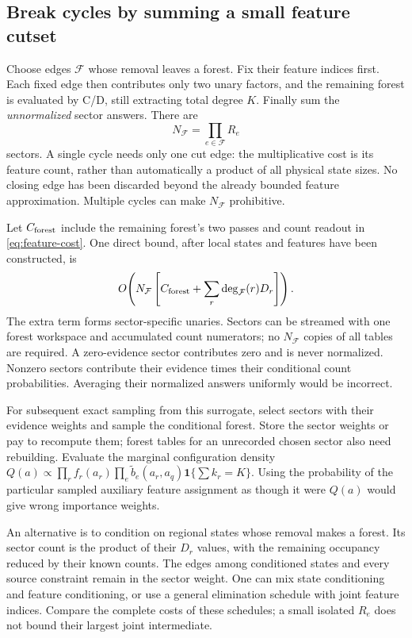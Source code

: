 \documentclass[10pt,a4paper]{article}
\newcommand{\ind}{\mathbf 1}
\begin{document}
\subsection{Break cycles by summing a small feature cutset}
Choose edges $\mathcal F$ whose removal leaves a forest. Fix their feature indices first. Each fixed edge
then contributes only two unary factors, and the remaining forest is evaluated by C/D, still extracting
total degree $K$. Finally sum the \emph{unnormalized} sector answers. There are
\[
 N_{\mathcal F}=\prod_{e\in\mathcal F}R_e
\]
sectors. A single cycle needs only one cut edge: the multiplicative cost is its feature count, rather than
automatically a product of all physical state sizes. No closing edge has been discarded beyond the already
bounded feature approximation. Multiple cycles can make $N_{\mathcal F}$ prohibitive.

Let $C_{\rm forest}$ include the remaining forest's two passes and count readout in
\eqref{eq:feature-cost}. One direct bound, after local states and features have been constructed, is
\begin{equation}
 O\!\left(N_{\mathcal F}
       \left[C_{\rm forest}+\sum_r\deg_{\mathcal F}(r)D_r\right]\right).
 \label{eq:cycle-cost}
\end{equation}
The extra term forms sector-specific unaries. Sectors can be streamed with one forest workspace and
accumulated count numerators; no $N_{\mathcal F}$ copies of all tables are required. A zero-evidence sector
contributes zero and is never normalized. Nonzero sectors contribute their evidence times their conditional
count probabilities. Averaging their normalized answers uniformly would be incorrect.

For subsequent exact sampling from this surrogate, select sectors with their evidence weights and sample
the conditional forest. Store the sector weights or pay to recompute them; forest tables for an unrecorded
chosen sector also need rebuilding. Evaluate the marginal configuration density
$Q(a)\propto\prod_r f_r(a_r)\prod_e\widetilde b_e(a_r,a_q)\ind\{\sum k_r=K\}$.
Using the probability of the particular sampled auxiliary feature assignment as though it were $Q(a)$
would give wrong importance weights.

An alternative is to condition on regional states whose removal makes a forest. Its sector count is the
product of their $D_r$ values, with the remaining occupancy reduced by their known counts. The edges among
conditioned states and every source constraint remain in the sector weight. One can mix state conditioning
and feature conditioning, or use a general elimination schedule with joint feature indices. Compare the
complete costs of these schedules; a small isolated $R_e$ does not bound their largest joint intermediate.
\end{document}

